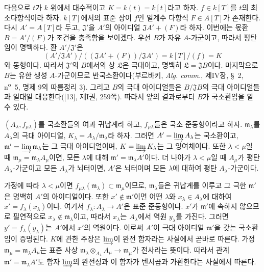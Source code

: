 \begin{env}[10.3.1.2]
\label{0.10.3.1.2-fr}
다음으로 $t$가 $k$ 위에서 대수적이고 $K=k(t)=k[t]$라고 하자.
$f\in k[T]$를 $t$의 최소다항식이라 하자. $k[T]$에서의 표준 상이
$f$인 일계수 다항식 $F\in A[T]$가 존재한다. 다시 $A'=A[T]$라 두고,
$\mathfrak J'$을 $A'$의 아이디얼 $\mathfrak J A'+(F)$라 하자. 이번에는
몫환 $B=A'/(F)$가 조건을 충족함을 보이겠다. 우선 $B$가 자유
$A$-가군이고, 따라서 평탄임이 명백하다. 환 $A'/\mathfrak J'$은
\[
  (A'/\mathfrak J A')/((\mathfrak J A'+(F))/\mathfrak J A')
  =k[T]/(f)=K
\]
와 동형이다. 따라서 $\mathfrak J'$의 $B$에서의 상 $\mathfrak L$은
극대이고, 명백히 $\mathfrak L=\mathfrak J B$이다. 마지막으로 $B$는
유한 생성 $A$-가군이므로 반국소환이다(부르바키,
\emph{Alg. comm.}, 제IV장, \S~2, n\textsuperscript{o}~5, 명제 9의
따름정리 3). 그리고 $B$의 극대 아이디얼들은 $B/\mathfrak J B$의
극대 아이디얼들과 일대일 대응한다([13], 제I권, 259쪽). 따라서 앞의
결과로부터 $B$가 국소환임을 알 수 있다.
\end{env}

\begin{lemma}[10.3.1.3]
\label{0.10.3.1.3-fr}
$(A_\lambda,f_{\mu\lambda})$를 국소환들의 여과 귀납계라 하고,
$f_{\mu\lambda}$들은 국소 준동형이라고 하자. $\mathfrak m_\lambda$를
$A_\lambda$의 극대 아이디얼, $K_\lambda=A_\lambda/\mathfrak m_\lambda$라
하자. 그러면 $A'=\varinjlim A_\lambda$는 국소환이고,
$\mathfrak m'=\varinjlim\mathfrak m_\lambda$는 그 극대 아이디얼이며,
$K=\varinjlim K_\lambda$는 그 잉여체이다. 또한 $\lambda<\mu$일 때
$\mathfrak m_\mu=\mathfrak m_\lambda A_\mu$이면, 모든 $\lambda$에 대해
$\mathfrak m'=\mathfrak m_\lambda A'$이다. 더 나아가
$\lambda<\mu$일 때 $A_\mu$가 평탄 $A_\lambda$-가군이고 모든
$A_\lambda$가 뇌터이면, $A'$은 뇌터이며 모든 $\lambda$에 대하여
평탄 $A_\lambda$-가군이다.
\end{lemma}

가정에 따라 $\lambda<\mu$이면
$f_{\mu\lambda}(\mathfrak m_\lambda)\subset\mathfrak m_\mu$이므로,
$\mathfrak m_\lambda$들은 귀납계를 이루고 그 극한 $\mathfrak m'$은
명백히 $A'$의 아이디얼이다. 또한 $x'\notin\mathfrak m'$이면 어떤
$\lambda$와 $x_\lambda\in A_\lambda$에 대하여
$x'=f_\lambda(x_\lambda)$이다. 여기서
$f_\lambda:A_\lambda\to A'$은 표준 준동형이다. $x'$가
$\mathfrak m'$에 속하지 않으므로 필연적으로
$x_\lambda\notin\mathfrak m_\lambda$이고, 따라서 $x_\lambda$는
$A_\lambda$에서 역원 $y_\lambda$를 가진다. 그러면
$y'=f_\lambda(y_\lambda)$는 $A'$에서 $x'$의 역원이다. 이로써 $A'$이
극대 아이디얼 $\mathfrak m'$을 갖는 국소환임이 증명된다. $K$에 관한
주장은 $\varinjlim$이 완전 함자라는 사실에서 곧바로 따른다. 가정
$\mathfrak m_\mu=\mathfrak m_\lambda A_\mu$는 표준 사상
$\mathfrak m_\lambda\otimes_{A_\lambda}A_\mu\to\mathfrak m_\mu$가
전사라는 뜻이다. 따라서 관계
$\mathfrak m'=\mathfrak m_\lambda A'$도 함자 $\varinjlim$의 완전성과
이 함자가 텐서곱과 가환한다는 사실에서 따른다.


